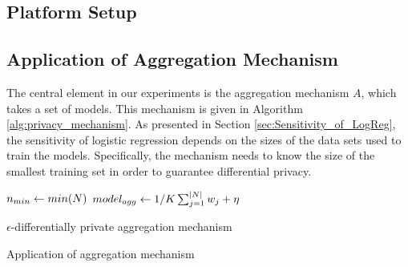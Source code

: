 \subsection{Platform Setup}

\subsection{Application of Aggregation Mechanism}

The central element in our experiments is the aggregation mechanism $A$, which takes a set of models. This mechanism is given in Algorithm \ref{alg:privacy_mechanism}. As presented in Section \ref{sec:Sensitivity_of_LogReg}, the sensitivity of logistic regression depends on the sizes of the data sets used to train the models. Specifically, the mechanism needs to know the size of the smallest training set in order to guarantee differential privacy.

\begin{algorithm}[H]
	\label{alg:privacy_mechanism}
		$n_{min} \leftarrow min(\boldmath{N})$
		$model_{agg} \leftarrow 1/K\sum_{j=1}^{|\boldmath{N}|} \boldmath{w_j} + \boldmath{\eta}$
\caption{$\epsilon$-differentially private aggregation mechanism}
\end{algorithm}

\begin{algorithm}[H]
\caption{Application of aggregation mechanism}
\end{algorithm}


